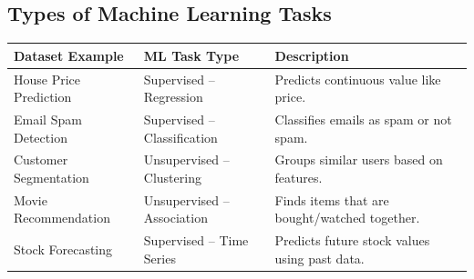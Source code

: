 \documentclass[11pt]{article}
\begin{document}
\subsection*{Types of Machine Learning Tasks}
\begin{table}[h!]
\centering
\renewcommand{\arraystretch}{1.3}
\begin{tabular}{|p{4cm}|p{4cm}|p{6cm}|}
\hline
\textbf{Dataset Example} & \textbf{ML Task Type} & \textbf{Description} \\
\hline
House Price Prediction & Supervised – Regression & Predicts continuous value like price. \\
Email Spam Detection & Supervised – Classification & Classifies emails as spam or not spam. \\
Customer Segmentation & Unsupervised – Clustering & Groups similar users based on features. \\
Movie Recommendation & Unsupervised – Association & Finds items that are bought/watched together. \\
Stock Forecasting & Supervised – Time Series & Predicts future stock values using past data. \\
\hline
\end{tabular}
\end{table}
\end{document}
